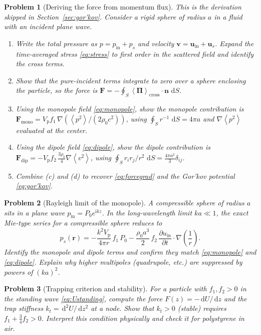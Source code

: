 \documentclass[11pt]{article}
\newtheorem{problem}{Problem}[section]
\newcommand{\rrho}{\rho_{0}}
\newcommand{\vp}{V_{\mathrm{p}}}
\newcommand{\avg}[1]{\left\langle #1 \right\rangle}
\newcommand{\vpSq}{\avg{p^{2}}}
\newcommand{\vvSq}{\avg{v^{2}}}
\newcommand{\dd}{\,\mathrm{d}}
\newcommand{\ii}{\mathrm{i}}
\newcommand{\uu}{\mathbf{u}}
\newcommand{\vv}{\mathbf{v}}
\newcommand{\nn}{\mathbf{n}}
\newcommand{\rr}{\mathbf{r}}
\begin{document}
\begin{problem}[Deriving the force from momentum flux]\label{prob:flux}
This is the derivation skipped in Section~\ref{sec:gor'kov}. Consider a rigid
sphere of radius $a$ in a fluid with an incident plane wave.
\begin{enumerate}[label=(\alph*)]
  \item Write the total pressure as $p=p_{\mathrm{in}}+p_s$ and velocity
  $\vv=\uu_{\mathrm{in}}+\uu_s$. Expand the time-averaged stress
  \eqref{eq:stress} to first order in the scattered field and identify the
  cross terms.
  \item Show that the pure-incident terms integrate to zero over a sphere
  enclosing the particle, so the force is
  $\mathbf{F}=-\oint_S \avg{\boldsymbol{\Pi}}_{\mathrm{cross}}\cdot\nn\,\dd S$.
  \item Using the monopole field \eqref{eq:monopole}, show the monopole
  contribution is $\mathbf{F}_{\mathrm{mono}}=\vp f_1\,\nabla\left(\vpSq/(2\rrho c^2)\right)$,
  using $\oint_S r^{-1}\,\dd S=4\pi a$ and $\nabla\vpSq$ evaluated at the
  center.
  \item Using the dipole field \eqref{eq:dipole}, show the dipole contribution
  is $\mathbf{F}_{\mathrm{dip}}=-\vp f_2\,\frac{3\rrho}{4}\nabla\vvSq$,
  using $\oint_S r_i r_j/r^2\,\dd S=\frac{4\pi a^2}{3}\delta_{ij}$.
  \item Combine (c) and (d) to recover \eqref{eq:forcegrad} and the Gor'kov
  potential \eqref{eq:gor'kov}.
\end{enumerate}
\end{problem}

\begin{problem}[Rayleigh limit of the monopole]\label{prob:rayleigh}
A compressible sphere of radius $a$ sits in a plane wave
$p_{\mathrm{in}}=P_0 e^{\ii kz}$. In the long-wavelength limit $ka\ll1$, the
exact Mie-type series for a compressible sphere reduces to
\begin{equation}
  p_s(\rr)=-\frac{k^2\vp}{4\pi r}\,f_1\,P_0
  -\frac{\rrho a^3}{2}\,f_2\,\frac{\partial u_{\mathrm{in}}}{\partial t}\cdot\nabla\!\left(\frac1r\right).
\end{equation}
Identify the monopole and dipole terms and confirm they match
\eqref{eq:monopole} and \eqref{eq:dipole}. Explain why higher multipoles
(quadrupole, etc.) are suppressed by powers of $(ka)^2$.
\end{problem}

\begin{problem}[Trapping criterion and stability]\label{prob:stability}
For a particle with $f_1,f_2>0$ in the standing wave
\eqref{eq:Ustanding}, compute the force $F(z)=-\dd U/\dd z$ and the trap
stiffness $k_t=\dd^2 U/\dd z^2$ at a node. Show that
$k_t>0$ (stable) requires $f_1+\frac34 f_2>0$. Interpret this condition
physically and check it for polystyrene in air.
\end{problem}
\end{document}
